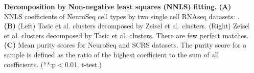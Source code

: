 \textbf{Decomposition by Non-negative least squares (NNLS) fitting.}
\textbf{(A)} NNLS coefficients of NeuroSeq cell types by two single cell RNAseq datasets: \citep{Zeisel_2015,Tasic_2016}.
\textbf{(B)} (Left) Tasic et al. clusters decomposed by Zeisel et al. clusters. (Right) Zeisel et al. clusters decomposed by Tasic et al. clusters. There are few perfect matches.
\textbf{(C)} Mean purity scores for NeuroSeq and SCRS datasets. The purity score for a sample is defined as the ratio of the highest coefficient to the sum of all coefficients. (**:p$<$0.01, t-test.)



